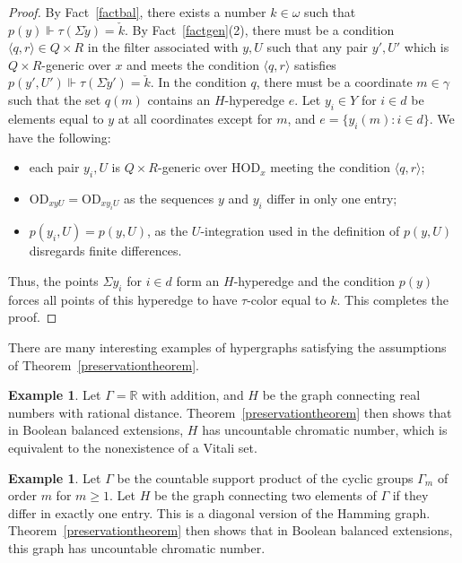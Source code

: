 \documentclass{article}
\newcommand{\gw}{\omega}
\newcommand{\gS}{\Sigma}
\newcommand{\hvd}{\mathrm{HOD}}
\newcommand{\vd}{\mathrm{OD}}
\theoremstyle{definition}
\newtheorem{example}[theorem]{Example}
\begin{document}
\begin{proof}
By Fact~\ref{factbal}, there exists a number $k\in\gw$ such that $p(y)\Vdash\tau(\Sigma\check y)=\check k$. By Fact~\ref{factgen}(2), there must be a condition $\langle q, r\rangle\in Q\times R$ in the filter associated with $y, U$ such that any pair $y' ,U'$ which is $Q\times R$-generic over $x$ and meets the condition $\langle q, r\rangle$ satisfies $p(y', U')\Vdash\tau(\Sigma\check y')=\check k$. In the condition $q$, there must be a coordinate $m\in\gamma$ such that the set $q(m)$ contains an $H$-hyperedge $e$. Let $y_i\in Y$ for $i\in d$ be elements equal to $y$ at all coordinates except for $m$, and $e=\{y_i(m)\colon i\in d\}$.  We have the following:

\begin{itemize}
\item each pair $y_i, U$ is $Q\times R$-generic over $\hvd_{x}$ meeting the condition $\langle q, r\rangle$;
\item $\vd_{xyU}=\vd_{xy_iU}$ as the sequences $y$ and $y_i$ differ in only one entry;
\item $p(y_i, U)=p(y, U)$, as the $U$-integration used in the definition of $p(y, U)$ disregards finite differences.
\end{itemize}

\noindent Thus, the points $\gS y_i$ for $i\in d$ form an $H$-hyperedge and the condition $p(y)$ forces all points of this hyperedge to have $\tau$-color equal to $k$. This completes the proof.
\end{proof}

\noindent There are many interesting examples of hypergraphs satisfying the assumptions of Theorem~\ref{preservationtheorem}.

\begin{example}
	\label{vitaliexample}
	Let $\Gamma=\mathbb{R}$ with addition, and $H$ be the graph connecting real numbers with rational distance. Theorem~\ref{preservationtheorem} then shows that in Boolean balanced extensions, $H$ has uncountable chromatic number, which is equivalent to the nonexistence of a Vitali set.
\end{example}

\begin{example}
	Let $\Gamma$ be the countable support product of the cyclic groups $\Gamma_m$ of order $m$ for $m\geq 1$. Let $H$ be the graph connecting two elements of $\Gamma$ if they differ in exactly one entry. This is a diagonal version of the Hamming graph. Theorem~\ref{preservationtheorem} then shows that in Boolean balanced extensions, this graph has uncountable chromatic number.
\end{example}
\end{document}

